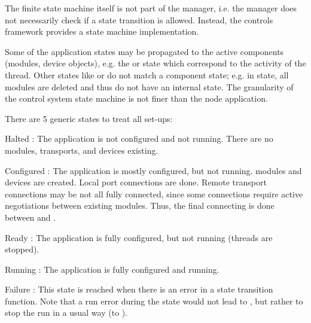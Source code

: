 The finite state machine itself is not part of the manager, 
      i.e. the manager does not necessarily check if a state transition 
      is allowed. Instead, the controls framework provides a 
      state machine implementation.

Some of the application states may be propagated to the 
      active components (modules, device objects), e.g. the 
       or  state which correspond to the activity of the thread. 
      Other states like  or  do not match a component state; 
      e.g. in  state, all modules are deleted and thus do not 
      have an internal state. The granularity of the control system state 
      machine is not finer than the node application.

There are 5 generic states to treat all set-ups: 
\begin{compactdesc}
\item[Halted] : The application is not configured and not running. 
	 There are no modules, transports, and devices existing.
\item[Configured] : The application is mostly configured, but not running. 
	 modules and devices are created. Local port connections are done.
	  Remote transport connections may be not all fully connected, 
	  since some connections require active negotiations between existing 
	  modules. Thus, the final connecting is done between 
	   and .  
\item[Ready] : The application is fully configured, but not running 
	 (threads are stopped).
\item[Running] : The application is fully configured and running.
\item[Failure] : This state is reached when there is an error in a 
	 state transition function. Note that a run error during the 
	  state would not lead to , but rather to stop 
	 the run in a usual way (to ).
\end{compactdesc}

